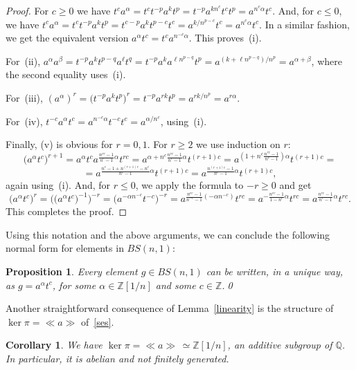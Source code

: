 \documentclass[english]{amsart}
\newtheorem{cor}[thm]{Corollary}
\newtheorem{prop}[thm]{Proposition}
\theoremstyle{definition}
\newcommand\ZZ{\mathbb{Z}}
\newcommand{\QQ}{{\mathbb Q}}
\newcommand{\ncl}[1]{\ll \!#1 \!\gg}
\begin{document}
\begin{proof}
For $c\geq 0$ we have $t^c a^{\alpha} =t^c t^{-p}a^k t^{p}= t^{-p}a^{kn^c} t^{c}t^{p}=a^{n^c \alpha} t^c$. And, for $c\leq 0$, we have $t^c a^{\alpha} =t^c t^{-p}a^k t^{p}=t^{c-p}a^k t^{p-c}t^c= a^{k/n^{p-c}} t^{c} =a^{n^c \alpha} t^c$. In a similar fashion, we get the equivalent version $a^{\alpha} t^c= t^c a^{n^{-c} \alpha}$. This proves~(i).

For~(ii), $a^{\alpha}a^{\beta}=t^{-p}a^k t^{p-q} a^{\ell} t^q =t^{-p}a^ka^{\ell n^{p-q}} t^p =a^{(k+\ell n^{p-q})/n^p}=a^{\alpha+\beta}$, where the second equality uses~(i).

For~(iii), $(a^{\alpha})^r =\big(t^{-p}a^k t^p\big)^r =t^{-p} a^{rk} t^p=a^{rk/n^p}=a^{r\alpha}$.

For~(iv), $t^{-c}a^{\alpha}t^c=a^{n^{-c}\alpha}t^{-c}t^c =a^{\alpha/n^c}$, using~(i).

Finally, (v) is obvious for $r=0,1$. For $r\geq 2$ we use induction on $r$: 
 $$
\big( a^{\alpha} t^c \big)^{r+1}= a^{\alpha}t^c a^{\frac{n^{rc}-1}{n^c-1}\alpha} t^{rc} = a^{\alpha +n^c \frac{n^{rc}-1}{n^c-1}\alpha} t^{(r+1)c} =a^{(1+n^c \frac{n^{rc}-1}{n^c-1})\alpha} t^{(r+1)c}=
 $$
 $$
=a^{\frac{n^c-1+n^{(r+1)c}-n^c}{n^c-1}\alpha} t^{(r+1)c} =a^{\frac{n^{(r+1)c}-1}{n^c-1}\alpha} t^{(r+1)c},
$$
again using~(i). And, for $r\leq 0$, we apply the formula to $-r\geq 0$ and get  
 $$
\big( a^{\alpha} t^c \big)^r =\big( \big( a^{\alpha} t^c \big)^{-1} \big)^{-r} =\big( a^{-\alpha n^{-c}} t^{-c} \big)^{-r} =a^{\frac{n^{rc}-1}{n^{-c}-1}(-\alpha n^{-c})} t^{rc} =a^{-\frac{n^{rc}-1}{1-n^c}\alpha} t^{rc} =a^{\frac{n^{rc}-1}{n^c-1}\alpha} t^{rc}.
 $$
This completes the proof.
\end{proof}

Using this notation and the above arguments, we can conclude the following normal form for elements in $BS(n,1)$:

\begin{prop}
Every element $g\in BS(n,1)$ can be written, in a unique way, as $g=a^{\alpha}t^c$, for some $\alpha\in \ZZ[1/n]$ and some $c\in \ZZ$.\qed
\end{prop}

Another straightforward consequence of Lemma~\ref{linearity} is the structure of $\ker \pi=\ncl{a}$ of~\eqref{ses}. 

\begin{cor}\label{cor: kernel}
We have $\ker \pi =\ncl{a} \,\simeq \ZZ[1/n]$, an additive subgroup of $\QQ$. In particular, it is abelian and not finitely generated. 
\end{cor}
\end{document}
